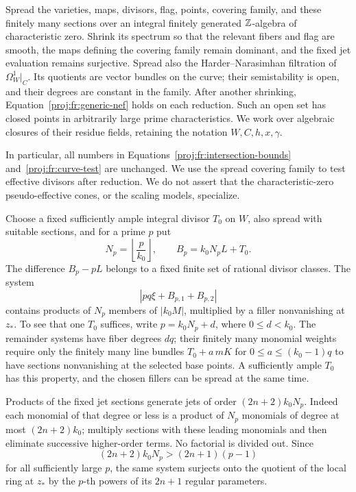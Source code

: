 Spread the varieties, maps, divisors, flag, points, covering family,
and these finitely many sections over an integral finitely generated
\(\mathbb{Z}\)-algebra of characteristic zero. Shrink its spectrum so that the
relevant fibers and flag are smooth, the maps defining the covering
family remain dominant, and the fixed jet evaluation remains
surjective. Spread also the Harder--Narasimhan filtration of
\(\Omega_W^1|_C\). Its quotients are vector bundles on the curve; their
semistability is open, and their degrees are constant in the family.
After another shrinking, Equation~\eqref{proj:fr:generic-nef} holds on each
reduction. Such an open set has closed points in arbitrarily large
prime characteristics. We work over algebraic closures of their
residue fields, retaining the notation \(W,C,h,x,\gamma\).

In particular, all numbers in
Equations~\eqref{proj:fr:intersection-bounds} and~\eqref{proj:fr:curve-test}
are unchanged. We use the spread covering family to test effective
divisors after reduction. We do not assert that the characteristic-zero
pseudo-effective cones, or the scaling models, specialize.

Choose a fixed sufficiently ample integral divisor \(T_0\) on \(W\),
also spread with suitable sections, and for a prime \(p\) put
\begin{equation}
\label{proj:fr:bp}
 N_p=\left\lfloor\frac p{k_0}\right\rfloor,\qquad
 B_p=k_0N_pL+T_0.
\end{equation}
The difference \(B_p-pL\) belongs to a fixed finite set of rational
divisor classes. The system
\[
 |pq\xi+B_{p,1}+B_{p,2}|
\]
contains products of \(N_p\) members of \(|k_0M|\), multiplied by a
filler nonvanishing at \(z_*\). To see that one \(T_0\) suffices, write
\(p=k_0N_p+d\), where \(0\leq d<k_0\). The remainder systems have fiber
degrees \(dq\); their finitely many monomial weights require only the
finitely many line bundles \(T_0+a\,mK\) for
\(0\leq a\leq(k_0-1)q\) to have sections nonvanishing at the selected
base points. A sufficiently ample \(T_0\) has this property, and the
chosen fillers can be spread at the same time.

Products of the fixed jet sections generate jets of order
\((2n+2)k_0N_p\). Indeed each monomial of that degree or less is a
product of \(N_p\) monomials of degree at most \((2n+2)k_0\);
multiply sections with these leading monomials and then eliminate
successive higher-order terms. No factorial is divided out. Since
\[
 (2n+2)k_0N_p>(2n+1)(p-1)
\]
for all sufficiently large \(p\), the same system surjects onto the
quotient of the local ring at \(z_*\) by the \(p\)-th powers of its
\(2n+1\) regular parameters.

